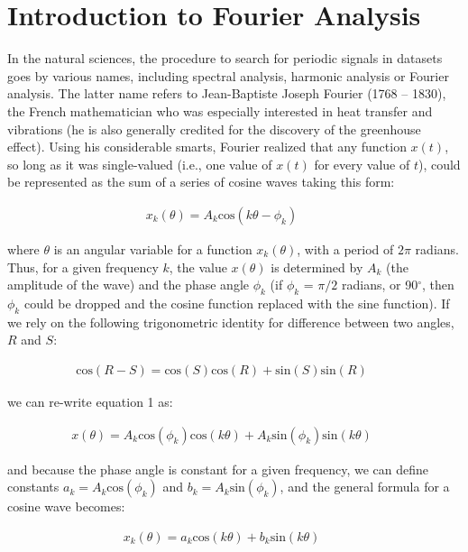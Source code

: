 \section{Introduction to Fourier Analysis}
\noindent In the natural sciences, the procedure to search for periodic signals in datasets goes by various names, including spectral analysis, harmonic analysis or Fourier analysis. The latter name refers to Jean-Baptiste Joseph Fourier (1768 -- 1830), the French mathematician who was especially interested in heat transfer and vibrations (he is also generally credited for the discovery of the greenhouse effect). Using his considerable smarts, Fourier realized that any function $x(t)$, so long as it was single-valued (i.e., one value of $x(t)$ for every value of $t$), could be represented as the sum of a series of cosine waves taking this form:

\begin{align}
x_k(\theta) = A_k \mathrm{cos}(k\theta - \phi_k) \qquad
\end{align}

\noindent where $\theta$ is an angular variable for a function $x_k(\theta)$, with a period of $2\pi$ radians. Thus, for a given frequency $k$, the value $x(\theta)$ is determined by $A_k$ (the amplitude of the wave) and the phase angle $\phi_k$ (if $\phi_k$ = $\pi/2$ radians, or 90$^{\circ}$, then $\phi_k$ could be dropped and the cosine function replaced with the sine function). If we rely on the following trigonometric identity for difference between two angles, $R$ and $S$:

\begin{align}
\mathrm{cos}(R-S) = \mathrm{cos}(S)\mathrm{cos}(R) + \mathrm{sin}(S)\mathrm{sin}(R) \qquad
\end{align}

\noindent we can re-write equation 1 as:

\begin{align}
x(\theta) = A_k \mathrm{cos}(\phi_k)\mathrm{cos}(k\theta) +  A_k \mathrm{sin}(\phi_k) \mathrm{sin}(k\theta)\qquad
\end{align}

\noindent and because the phase angle is constant for a given frequency, we can define constants $a_k = A_k \mathrm{cos}(\phi_k)$ and $b_k =  A_k \mathrm{sin}(\phi_k)$, and the general formula for a cosine wave becomes:

\begin{align}
x_k(\theta) = a_k \mathrm{cos}(k\theta) +  b_k \mathrm{sin}(k\theta) \qquad 
\end{align}

